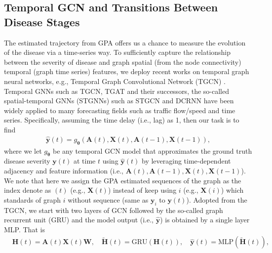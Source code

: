 \documentclass{article} %
\begin{document}
\subsection{Temporal GCN and Transitions Between Disease Stages}\label{sec:key_factor_2}
The estimated trajectory from GPA offers us a chance to measure the evolution of the disease via a time-series way. To sufficiently capture the relationship between the severity of disease and graph spatial (from the node connectivity) temporal (graph time series) features, we deploy recent works on temporal graph neural networks, e.g., Temporal Graph Convolutional
Network (TGCN) \citep{zhao2019t}. Temporal GNNs such as TGCN, TGAT \citep{xu2020inductive} and their successors, the so-called spatial-temporal GNNs (STGNNs) such as STGCN \citep{yu2017spatio} and DCRNN \citep{li2017diffusion} have been widely applied to many forecasting fields such as traffic flow/speed and time series. Specifically, assuming the time delay (i.e., lag) as 1, then our task is to find 
\begin{align}
    \widehat{\mathbf y}(t) = {g}_{\boldsymbol{\theta}}(\mathbf A(t), \mathbf X(t), \mathbf A(t-1), \mathbf X(t-1)),
\end{align}
where we let $g_{\boldsymbol{\theta}}$ be any temporal GCN model that approximates the ground truth disease severity $\mathbf y(t)$ at time $t$ using $\widehat{\mathbf y}(t)$ by leveraging time-dependent adjacency and feature information (i.e., $\mathbf A(t), \mathbf A(t-1), \mathbf X(t), \mathbf X(t-1)$). We note that here we assign the GPA estimated sequences of the graph as the index denote as $(t)$ (e.g., $\mathbf X(t)$) instead of keep using $i$ (e.g., $\mathbf X(i)$) which standards of graph $i$ without sequence (same as $\mathbf y_i$ to $\mathbf y(t)$). Adopted from the TGCN, we start with two layers of GCN \citep{kipf2016semi} followed by the so-called graph recurrent unit (GRU) and the model output (i.e., $\widehat{\mathbf y}$) is obtained by a single layer MLP. That is
\begin{align}\label{eq:tgcn}
    &\mathbf H(t) = \mathbf A(t) \mathbf X(t) \mathbf W, \quad
    \widetilde{\mathbf H}(t) = \mathrm{GRU} (\mathbf H(t)), \quad \widehat {\mathbf y}(t) = \mathrm{MLP}(\widetilde{\mathbf H}(t)),
\end{align}
\end{document}
